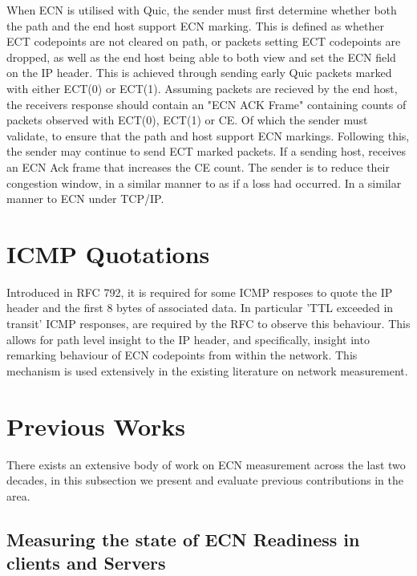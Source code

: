 \documentclass{l4proj}
\begin{document}
When ECN is utilised with Quic, the sender must first determine whether both the path and the end host support ECN marking. This is defined as whether ECT codepoints are not cleared on path, or packets setting ECT codepoints are dropped, as well as the end host being able to both view and set the ECN field on the IP header. This is achieved through sending early Quic packets marked with either ECT(0) or ECT(1). Assuming packets are recieved by the end host, the receivers response should contain an "ECN ACK Frame" containing counts of packets observed with ECT(0), ECT(1) or CE. Of which the sender must validate, to ensure that the path and host support ECN markings. Following this, the sender may continue to send ECT marked packets. If a sending host, receives an ECN Ack frame that increases the CE count. The sender is to reduce their congestion window, in a similar manner to as if a loss had occurred. In a similar manner to ECN under TCP/IP.

\section{ICMP Quotations}

Introduced in RFC 792, it is required for some ICMP resposes to quote the IP header and the first 8 bytes of associated data. In particular 'TTL exceeded in transit' ICMP responses, are required by the RFC to observe this behaviour. This allows for path level insight to the IP header, and specifically, insight into remarking behaviour of ECN codepoints from within the network. This mechanism is used extensively in the existing literature on network measurement.

\section{Previous Works}

There exists an extensive body of work on ECN measurement across the last two decades, in this subsection we present and evaluate previous contributions in the area.

\subsection{Measuring the state of ECN Readiness in clients and Servers}
\end{document}

